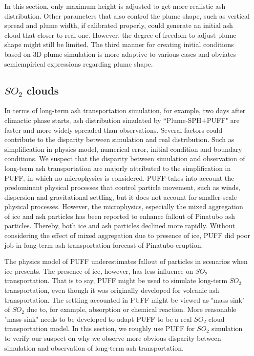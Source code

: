 In this section, only maximum height is adjusted to get more realistic ash distribution. Other parameters that also control the plume shape, such as vertical spread and plume width, if calibrated properly, could generate an initial ash cloud that closer to real one. However, the degree of freedom to adjust plume shape might still be limited. The third manner for creating initial conditions based on 3D plume simulation is more adaptive to various cases and obviates semiempirical expressions regarding plume shape.

\subsection{$SO_2$ clouds}
In terms of long-term ash transportation simulation, for example, two days after climactic phase starts, ash distribution simulated by ``Plume-SPH+PUFF" are faster and more widely spreaded than observations. Several factors could contribute to the disparity between simulation and real distribution. Such as simplification in physics model, numerical error, initial condition and boundary conditions. We suspect that the disparity between simulation and observation of long-term ash transportation are majorly attributed to the simplification in PUFF, in which no microphysics is considered. PUFF takes into account the predominant physical processes that control particle movement, such as winds, dispersion and gravitational settling, but it does not account for smaller-scale physical processes. However, the microphysics, especially the mixed aggregation of ice and ash particles has been reported to enhance fallout \citep{guo2004particles} of Pinatubo ash particles. Thereby, both ice and ash particles declined more rapidly. Without considering the effect of mixed aggregation due to presence of ice, PUFF did poor job in long-term ash transportation forecast of Pinatubo eruption.

The physics model of PUFF underestimates fallout of particles in scenarios when ice presents. The presence of ice, however, has less influence on $SO_2$ transportation. That is to say, PUFF might be used to simulate long-term $SO_2$ transportation, even though it was originally developed for volcanic ash transportation. The settling accounted in PUFF might be viewed as "mass sink" of $SO_2$ due to, for example, absorption or chemical reaction. More reasonable "mass sink" needs to be developed to adapt PUFF to be a real $SO_2$ cloud transportation model. In this section, we roughly use PUFF for $SO_2$ simulation to verify  our suspect on why we observe more obvious disparity between simulation and observation of long-term ash transportation. 

